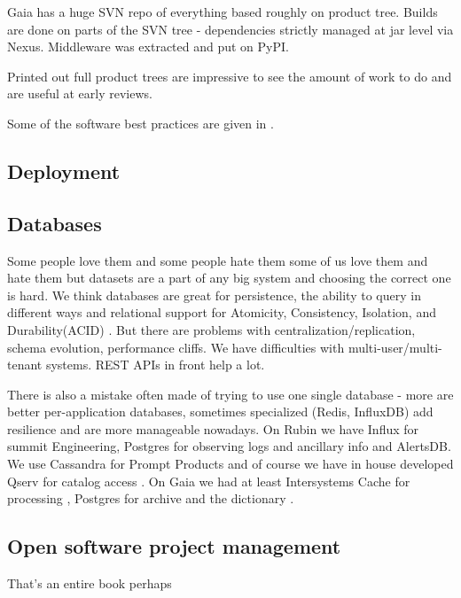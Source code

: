 \documentclass[11pt,twoside]{article}
\begin{document}
Gaia has a huge SVN repo of everything based roughly on product tree.  Builds are done on parts of the SVN tree - dependencies strictly managed at jar level via Nexus.
Middleware was extracted and put on PyPI.

Printed out full product trees are impressive to see the amount of work to do and are useful at early reviews.

Some of the software best practices are given in \citet{2018SPIE10707E..09J}.

\subsection{Deployment}
\subsection{Databases}
Some people love them and some people hate them some of us love them and hate them but datasets are a part of any big system and choosing the correct one is hard.
We think databases are great for persistence, the ability to query in different ways and relational support for Atomicity, Consistency, Isolation, and Durability(ACID) .
But there are problems with centralization/replication, schema evolution, performance cliffs.
We have  difficulties with multi-user/multi-tenant systems.
REST APIs in front help a lot.

There is also a mistake often made of trying to use one single database -
more are better per-application databases, sometimes specialized (Redis, InfluxDB) add resilience and are more manageable nowadays.
On Rubin we have Influx for summit Engineering, Postgres for observing logs and ancillary info and AlertsDB.
We use Cassandra for Prompt Products and of course we have in house developed Qserv for catalog access \citep{C15_adassxxxii}.
On Gaia we had at least Intersystems Cache for processing \cite{2011ExA....31..215O}, Postgres for archive and the dictionary .

\subsection{Open software project management}
That's an entire book perhaps



\end{document}
